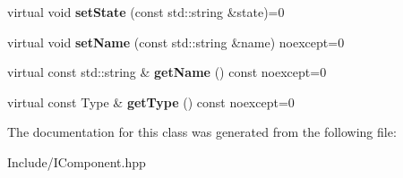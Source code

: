 \begin{DoxyCompactItemize}
virtual void {\bfseries set\+State} (const std\+::string \&state)=0
\item 
\mbox{\label{classnts_1_1IComponent_a61dfe7e130dee94f08b9aaca5a89be7e}} 
virtual void {\bfseries set\+Name} (const std\+::string \&name) noexcept=0
\item 
\mbox{\label{classnts_1_1IComponent_ad9fece97a1cc1154953d9c0a9df7cab3}} 
virtual const std\+::string \& {\bfseries get\+Name} () const noexcept=0
\item 
\mbox{\label{classnts_1_1IComponent_ac8050d5c0c2f6d4f426077d92b814c5d}} 
virtual const Type \& {\bfseries get\+Type} () const noexcept=0
\end{DoxyCompactItemize}


The documentation for this class was generated from the following file\+:\begin{DoxyCompactItemize}
\item 
Include/I\+Component.\+hpp\end{DoxyCompactItemize}
